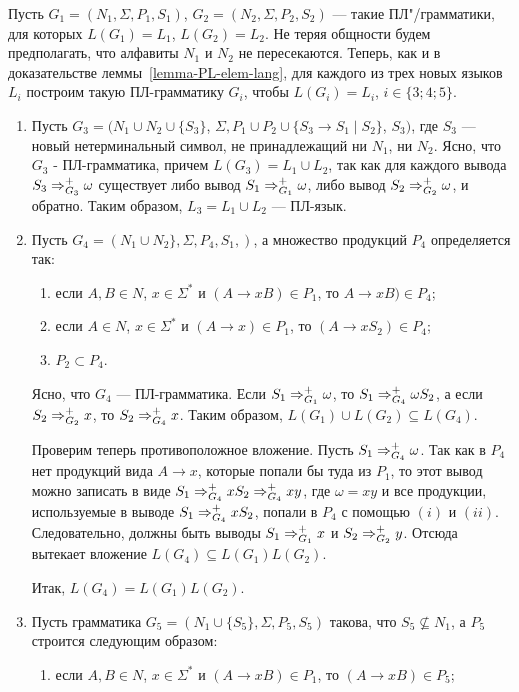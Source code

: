 \begin{myproof}
Пусть $G_1=(N_1,\Sigma,P_1,S_1)$, $G_2=(N_2,\Sigma,P_2,S_2)$ --- такие ПЛ"/грамматики, для которых $L(G_1)=L_1$, $L(G_2)=L_2$. Не теряя общности будем предполагать, что алфавиты $N_1$ и $N_2$ не пересекаются. Теперь, как и в доказательстве леммы~\ref{lemma-PL-elem-lang}, для каждого из трех новых языков $L_i$ построим такую ПЛ-грамматику $G_i$, чтобы $L(G_i)=L_i$, $i\in\{3;4;5\}$.
\begin{enumerate}
\item Пусть $G_3 = (N_1\cup N_2\cup\{S_3\}$, $\Sigma, P_1\cup P_2\cup\{S_3\to S_1\mid S_2\}$, $S_3)$, где $S_3$ --- новый нетерминальный символ, не принадлежащий ни $N_1$, ни $N_2$. Ясно, что $G_3$ - ПЛ-грамматика, причем $L(G_3)=L_1\cup L_2$, так как для каждого вывода $S_3\Rightarrow_{G_3}^+\omega$ существует либо вывод $S_1\Rightarrow_{G_1}^+\omega$, либо вывод $S_2\Rightarrow_{G_2}^+\omega$, и обратно. Таким образом, $L_3=L_1\cup L_2$ --- ПЛ-язык.

\item Пусть $G_4=(N_1 \cup N_2 \}, \Sigma, P_4, S_1,)$, а множество продукций $P_4$ определяется так:

\begin{enumerate}[label=(\emph{\roman*})]
	\item если $A,B\in N$, $x\in\Sigma^*$ и $(A\to xB)\in P_1$, то $A\to xB)\in P_4$;
	\item если $A\in N$, $x\in\Sigma^*$ и $(A\to x)\in P_1$, то $(A\to xS_2)\in P_4$;
	\item $P_2\subset P_4$.
\end{enumerate}
Ясно, что $G_4$ --- ПЛ-грамматика. Если $S_1\Rightarrow_{G_1}^+\omega$, то $S_1\Rightarrow_{G_4}^+\omega S_2$, а если $S_2\Rightarrow_{G_2}^+x$, то $S_2\Rightarrow_{G_4}^+x$. Таким образом, $L(G_1)\cup L(G_2)\subseteq L(G_4)$.

Проверим теперь противоположное вложение. Пусть $S_1\Rightarrow_{G_4}^+\omega$. Так как в $P_4$ нет продукций вида $A\to x$, которые попали бы туда из $P_1$, то этот вывод можно записать в виде $S_1\Rightarrow_{G_4}^+xS_2\Rightarrow_{G_4}^+xy$, где $\omega=xy$ и все продукции, используемые в выводе $S_1\Rightarrow_{G_4}^+xS_2$, попали в $P_4$ с помощью $(i)$ и $(ii)$. Следовательно, должны быть выводы $S_1\Rightarrow_{G_1}^+x$ и $S_2\Rightarrow_{G_2}^+y$. Отсюда вытекает вложение $L(G_4)\subseteq L(G_1)L(G_2)$.

Итак, $L(G_4)=L(G_1)L(G_2)$.

\item Пусть грамматика $G_5=(N_1\cup \{S_5\},\Sigma,P_5,S_5)$ такова, что $S_5\nsubseteq N_1$, а $P_5$ строится следующим образом:
\begin{enumerate}[label=(\emph{\roman*})]
	\item если $A,B\in N$, $x\in\Sigma^*$ и $(A\to xB)\in P_1$, то $(A\to xB)\in P_5$;


\end{enumerate}
\end{enumerate}
\end{myproof}

